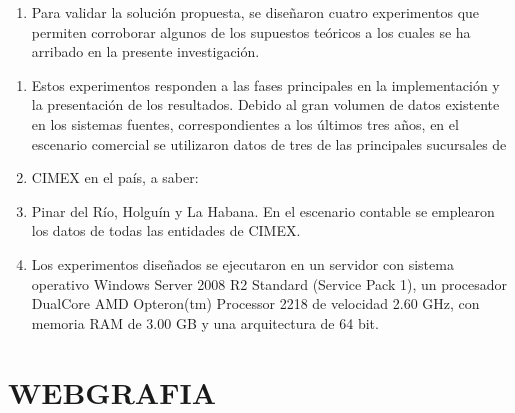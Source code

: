 \documentclass{article} %
\begin{document}
\begin{enumerate}
\item \textbf{ }Para validar la soluci\'{o}n propuesta, se dise\~{n}aron cuatro experimentos que permiten corroborar algunos de los supuestos te\'{o}ricos a los cuales se ha arribado en la presente investigaci\'{o}n. 
\end{enumerate}

\noindent 

\begin{enumerate}
\item  Estos experimentos responden a las fases principales en la implementaci\'{o}n y la presentaci\'{o}n de los resultados. Debido al gran volumen de datos existente en los sistemas fuentes, correspondientes a los \'{u}ltimos tres a\~{n}os, en el escenario comercial se utilizaron datos de tres de las principales sucursales de 

\item  CIMEX en el pa\'{i}s, a saber:

\item  Pinar del R\'{i}o, Holgu\'{i}n y La Habana. En el escenario contable se emplearon los datos de todas las entidades de CIMEX.

\item  Los experimentos dise\~{n}ados se ejecutaron en un servidor con sistema operativo Windows Server 2008 R2 Standard (Service Pack 1), un procesador DualCore AMD Opteron(tm) Processor 2218 de velocidad 2.60 GHz, con memoria RAM de 3.00 GB y una arquitectura de 64 bit.
\end{enumerate}

\noindent 

\noindent 

\noindent 

\noindent 

\noindent 

\noindent 

\noindent 

\noindent 

\noindent 

\noindent 

\noindent 

\noindent 

\noindent 

\noindent 

\noindent 

\noindent 

\noindent 

\noindent 
\section{WEBGRAFIA}
\end{document}
